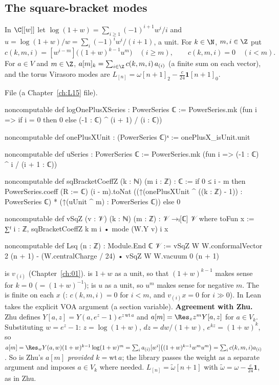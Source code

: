 \subsection{The square-bracket modes}

\begin{definition}\label{l14:def:sqbracket}
In $\C[[w]]$ let $\log(1+w) = \sum_{i\ge1}(-1)^{i+1}w^i/i$ and $u = \log(1+w)/w = \sum_i(-1)^iw^i/(i+1)$, a unit. For
$k\in\N$, $m,i\in\Z$ put
\begin{equation*}
  c(k,m,i) = [w^{i-m}]\bigl((1+w)^{k-1}u^m\bigr)\quad(i\ge m),\qquad c(k,m,i) = 0\quad(i<m).
\end{equation*}
For $a\in V$ and $m\in\Z$, $a[m]_k = \sum_{i\in\Z}c(k,m,i)\,a_{(i)}$ (a finite sum on each vector), and the torus Virasoro modes are
$L_{[n]} = \omega[n+1]_2 - \frac{c}{24}\mathbf 1[n+1]_0$.
\end{definition}
\noindent File  (a Chapter~\ref{ch:L15} file).
\begin{leancode}
noncomputable def logOnePlusXSeries : PowerSeries ℂ :=
  PowerSeries.mk (fun i => if i = 0 then 0 else (-1 : ℂ) ^ (i + 1) / (i : ℂ))

noncomputable def onePlusXUnit : (PowerSeries ℂ)ˣ := onePlusX_isUnit.unit

noncomputable def uSeries : PowerSeries ℂ := PowerSeries.mk (fun i => (-1 : ℂ) ^ i / (i + 1 : ℂ))

noncomputable def sqBracketCoeffZ (k : ℕ) (m i : ℤ) : ℂ :=
  if 0 ≤ i - m then
    PowerSeries.coeff (R := ℂ) (i - m).toNat
      ((↑(onePlusXUnit ^ ((k : ℤ) - 1)) : PowerSeries ℂ) * (↑(uUnit ^ m) : PowerSeries ℂ))
  else 0

noncomputable def vSqZ (v : 𝒱) (k : ℕ) (m : ℤ) : 𝒱 →ₗ[ℂ] 𝒱 where
  toFun x := ∑ᶠ i : ℤ, sqBracketCoeffZ k m i • mode (W.Y v) i x

noncomputable def Lsq (n : ℤ) : Module.End ℂ 𝒱 :=
  vSqZ W W.conformalVector 2 (n + 1)
    - (W.centralCharge / 24) • vSqZ W W.vacuum 0 (n + 1)
\end{leancode}
\begin{dictionary}
 is $v_{(i)}$ (Chapter~\ref{ch:01}).  is $1+w$ as a unit, so that $(1+w)^{k-1}$
makes sense for $k=0$ ($=(1+w)^{-1}$);  is $u$ as a unit, so $u^m$ makes sense for negative $m$. The 
is finite on each $x$ (: $c(k,m,i) = 0$ for $i<m$, and $v_{(i)}x = 0$ for $i\gg0$). In Lean
 takes the explicit VOA argument  (a section variable). \textbf{Agreement with Zhu.} Zhu defines
$Y[a,z] = Y(a,e^z-1)e^{z\,\mathrm{wt}\,a}$ and $a[m] = \Res_zz^mY[a,z]$ for $a\in V_k$. Substituting $w = e^z-1$:
$z = \log(1+w)$, $dz = dw/(1+w)$, $e^{kz} = (1+w)^k$, so $a[m] = \Res_wY(a,w)(1+w)^{k-1}\log(1+w)^m = \sum_ia_{(i)}[w^i]
\bigl((1+w)^{k-1}w^mu^m\bigr) = \sum_ic(k,m,i)a_{(i)}$. So  is Zhu's $a[m]$ \emph{provided $k = \mathrm{wt}\,a$};
the library passes the weight as a separate argument and imposes $a\in V_k$ where needed. $L_{[n]} = \tilde\omega[n+1]$ with
$\tilde\omega = \omega - \frac c{24}\mathbf 1$, as in Zhu.
\end{dictionary}
